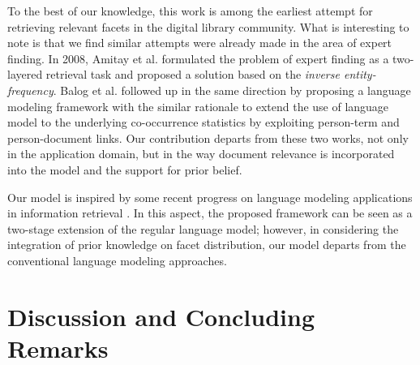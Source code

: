 To the best of our knowledge, this work is among the earliest attempt for retrieving
relevant facets in the digital library community.  What is interesting to note
is that we find similar attempts were already made in the area of expert
finding.  In 2008, Amitay et al. \cite{amitay2008finding} formulated the
problem of expert finding as a two-layered retrieval task and proposed a
solution based on the \emph{inverse entity-frequency}.  Balog et al.
\cite{balog2009language} followed up in the same direction by proposing a
language modeling framework with the similar rationale to extend the use of
language model to the underlying co-occurrence statistics by exploiting
person-term and person-document links.  Our contribution departs from these two
works, not only in the application domain, but in the way document relevance is
incorporated into the model and the support for prior belief.  
 
Our model is inspired by some recent progress on language modeling applications
in information retrieval \cite{lavrenko2001relevance,zaragorza2003bayesian}.
In this aspect, the proposed framework can be seen as a two-stage extension of
the regular language model; however, in considering the integration of prior
knowledge on facet distribution, our model departs from the conventional
language modeling approaches.  

\section{Discussion and Concluding Remarks}\label{s:concluding-remarks}


